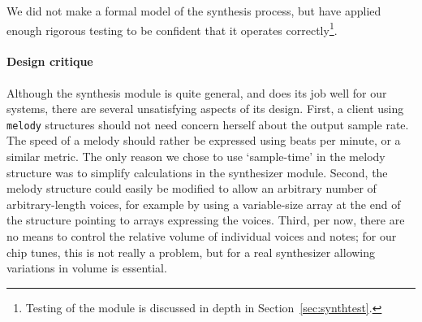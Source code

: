 \documentclass[a4paper,9pt]{article}
\newcommand{\isrc}[1]{\texttt{#1}}
\begin{document}
We did not make a formal model of the synthesis process, but have applied
enough rigorous testing to be confident that it operates
correctly\footnote{Testing of the module is discussed in depth in
Section~\ref{sec:synthtest}.}.

\paragraph{Design critique}
Although the synthesis module is quite general, and does its job well for our
systems, there are several unsatisfying aspects of its design. First, a client
using \isrc{melody} structures should not need concern herself about the
output sample rate. The speed of a melody should rather be expressed using
beats per minute, or a similar metric. The only reason we chose to use
`sample-time' in the melody structure was to simplify calculations in the
synthesizer module.  Second, the melody structure could easily be modified to
allow an arbitrary number of arbitrary-length voices, for example by using a
variable-size array at the end of the structure pointing to arrays expressing
the voices. Third, per now, there are no means to control the relative volume
of individual voices and notes; for our chip tunes, this is not really a
problem, but for a real synthesizer allowing variations in volume is
essential.  
\end{document}
